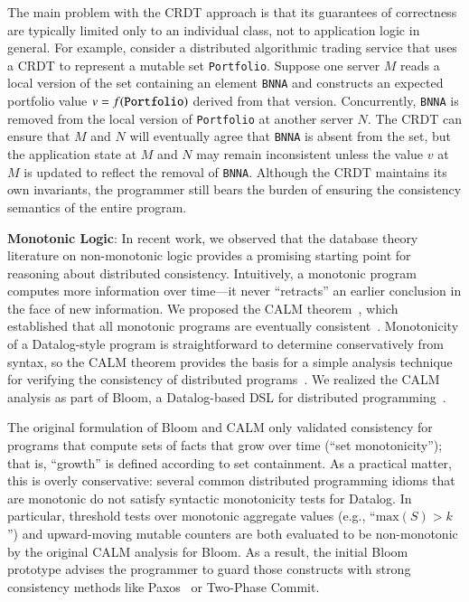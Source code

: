 The main problem with the CRDT approach is that its guarantees of correctness are typically limited only to an individual class, not to application logic in general. For example, consider a distributed algorithmic trading service that uses a CRDT to represent a mutable set \texttt{Portfolio}. Suppose one server $M$ reads a local version of the set containing an element \texttt{BNNA} and constructs an expected portfolio value $v = f(\mbox{\texttt{Portfolio}})$ derived from that version. Concurrently, \texttt{BNNA} is removed from the local version of \texttt{Portfolio} at another server $N$. The CRDT can ensure that $M$ and $N$ will eventually agree that \texttt{BNNA} is absent from the set, but the application state at $M$ and $N$ may remain inconsistent unless the value $v$ at $M$ is updated to reflect the removal of \texttt{BNNA}. Although the CRDT maintains its own invariants, the programmer still bears the burden of ensuring the consistency semantics of the entire program.

\vspace{0.5em}
\noindent \textbf{Monotonic Logic}: In recent work, we observed that the database theory literature on non-monotonic logic provides a promising starting point for reasoning about distributed consistency. Intuitively, a monotonic program computes more information over time---it never ``retracts'' an earlier conclusion in the face of new information. We proposed the CALM theorem~\cite{Hellerstein2010}, which established that all monotonic programs are eventually consistent~\cite{Ameloot2011}. Monotonicity of a Datalog-style program is straightforward to determine conservatively from syntax, so the CALM theorem provides the basis for a simple analysis technique for verifying the consistency of distributed programs~\cite{Alvaro2011}. We realized the CALM analysis as part of Bloom, a Datalog-based DSL for distributed programming~\cite{bloom}.

The original formulation of Bloom and CALM only validated consistency for programs that compute sets of facts that grow over time (``set monotonicity''); that is, ``growth'' is defined according to set containment. As a practical matter, this is overly conservative: several common distributed programming idioms that are monotonic do not satisfy syntactic monotonicity tests for Datalog. In particular, threshold tests over monotonic aggregate values (e.g., ``$\textrm{max}(S) > k$'') and upward-moving mutable counters are both evaluated to be non-monotonic by the original CALM analysis for Bloom.  As a result, the initial Bloom prototype advises the programmer to guard those constructs with strong consistency methods like Paxos~\cite{Lamport1998} or Two-Phase Commit. 

